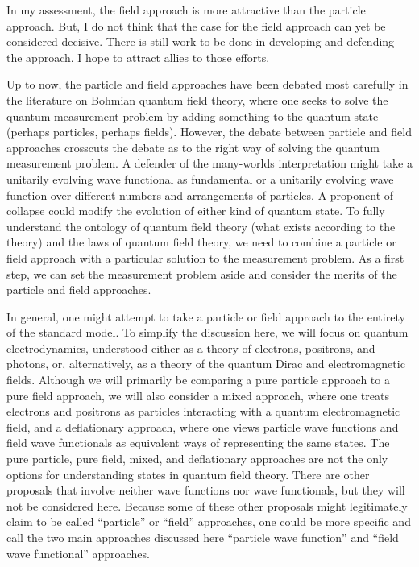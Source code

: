 \documentclass[onecolumn,secnumarabic,amsmath,amssymb,balancelastpage,nofootinbib]{article}
\begin{document}
In my assessment, the field approach is more attractive than the particle approach.  But, I do not think that the case for the field approach can yet be considered decisive.  There is still work to be done in developing and defending the approach.  I hope to attract allies to those efforts.

Up to now, the particle and field approaches have been debated most carefully in the literature on Bohmian quantum field theory, where one seeks to solve the quantum measurement problem by adding something to the quantum state (perhaps particles, perhaps fields).  However, the debate between particle and field approaches crosscuts the debate as to the right way of solving the quantum measurement problem.  A defender of the many-worlds interpretation might take a unitarily evolving wave functional as fundamental or a unitarily evolving wave function over different numbers and arrangements of particles.  A proponent of collapse could modify the evolution of either kind of quantum state.  To fully understand the ontology of quantum field theory (what exists according to the theory) and the laws of quantum field theory, we need to combine a particle or field approach with a particular solution to the measurement problem.  As a first step, we can set the measurement problem aside and consider the merits of the particle and field approaches.

In general, one might attempt to take a particle or field approach to the entirety of the standard model.  To simplify the discussion here, we will focus on quantum electrodynamics, understood either as a theory of electrons, positrons, and photons, or, alternatively, as a theory of the quantum Dirac and electromagnetic fields.  Although we will primarily be comparing a pure particle approach to a pure field approach, we will also consider a mixed approach, where one treats electrons and positrons as particles interacting with a quantum electromagnetic field, and a deflationary approach, where one views particle wave functions and field wave functionals as equivalent ways of representing the same states.  The pure particle, pure field, mixed, and deflationary approaches are not the only options for understanding states in quantum field theory.  There are other proposals that involve neither wave functions nor wave functionals, but they will not be considered here.  Because some of these other proposals might legitimately claim to be called ``particle'' or ``field'' approaches, one could be more specific and call the two main approaches discussed here ``particle wave function'' and ``field wave functional'' approaches.
\end{document}
